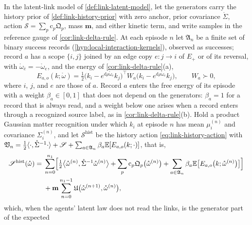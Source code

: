 In the latent-link model of \cref{def:link-latent-model}, let the generators carry the history prior
of \cref{def:link-history-prior} with zero anchor, prior covariance $\mathring\Sigma$, action
$\mathscr S=\sum_p\mathrm c_p\mathfrak Q_p$, mass $\mathbf m$, and either kinetic term, and write samples
in the reference gauge of \cref{cor:link-delta-rule}. At each episode $n$ let $\mathfrak A_n$ be a
finite set of binary success records (\cref{hyp:local-interaction-kernels}), observed as successes;
record $a$ has a scope $\{i,j\}$ joined by an edge copy $e:j\to i$ of $E_+$ or of its reversal, with
$\mathring\omega_{\bar e}=-\mathring\omega_e$, and the energy of \cref{cor:link-delta-rule}(a),
\begin{equation}
E_{a,o}(k;\mathring\omega)=\tfrac12\bigl(k_i-e^{\mathrm d\rho\mathring\omega_e}k_j\bigr)^\top W_a\bigl(k_i-e^{\mathrm d\rho\mathring\omega_e}k_j\bigr),
\qquad W_a\succ0,
\label{eq:link-comparison-record}
\end{equation}
where $i$, $j$, and $e$ are those of $a$. Record $a$ enters the free energy of its episode with a
weight $\beta_a\in[0,1]$ that does not depend on the generators: $\beta_a=1$ for a record that is
always read, and a weight below one arises when a record enters through a recognized source label,
as in \cref{cor:link-delta-rule}(b). Hold a product Gaussian matter recognition under which $k_i$ at
episode $n$ has mean $\mu^{(n)}_i$ and covariance $\Sigma^{(n)}_i$, and let $\mathscr S^{\mathrm{hist}}$ be
the history action \eqref{eq:link-history-action} with
$\mathfrak V_n=\tfrac12\langle\cdot,\mathring\Sigma^{-1}\cdot\rangle+\mathscr S+\sum_{a\in\mathfrak A_n}\beta_a\mathbb E[E_{a,o}(k;\cdot)]$,
that is,
\begin{equation}
\begin{aligned}
\mathscr S^{\mathrm{hist}}(\mathring\omega)={}&\sum_{n=0}^{n_1}\Bigl[\tfrac12\bigl\langle\mathring\omega^{(n)},\mathring\Sigma^{-1}\mathring\omega^{(n)}\bigr\rangle+\sum_p\mathrm c_p\mathfrak Q_p\bigl(\mathring\omega^{(n)}\bigr)+\sum_{a\in\mathfrak A_n}\beta_a\mathbb E\bigl[E_{a,o}\bigl(k;\mathring\omega^{(n)}\bigr)\bigr]\Bigr]\\
&+\mathbf m\sum_{n=0}^{n_1-1}\mathfrak U\bigl(\mathring\omega^{(n+1)},\mathring\omega^{(n)}\bigr),
\end{aligned}
\label{eq:link-history-objective}
\end{equation}
which, when the agents' latent law does not read the links, is the generator part of the expected
